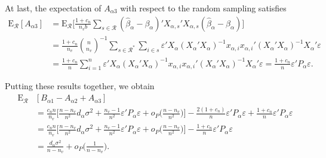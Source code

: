 \documentclass[Research_Module_ES.tex]{subfiles}
\begin{document}
At last, the expectation of $A_{\alpha3}$ with respect to the random sampling satisfies
\begin{align*}
\mathrm{E}_\mathcal{R}[A_{\alpha3}] 
&=\mathrm{E}_\mathcal{R}\biggl[ \frac{1+c_n}{n_vb}\sum_{s\in \mathcal{R}}(\hat{\beta}_\alpha-\beta_\alpha)'X_{\alpha,s}'X_{\alpha,s}(\hat{\beta}_\alpha-\beta_\alpha)\biggr]\\
&= \frac{1+c_n}{n_v}\binom{n}{n_v}^{-1}\sum_{s\in\mathcal{R}^\ast}\sum_{i\in s}\varepsilon'X_{\alpha}(X_{\alpha}'X_{\alpha})^{-1}x_{\alpha,i}x_{\alpha,i}'(X_{\alpha}'X_{\alpha})^{-1}X_{\alpha}'\varepsilon\\
&= \frac{1+c_n}{n}\sum_{i=1}^n\varepsilon'X_{\alpha}(X_{\alpha}'X_{\alpha})^{-1}x_{\alpha,i}x_{\alpha,i}'(X_{\alpha}'X_{\alpha})^{-1}X_{\alpha}'\varepsilon
= \frac{1+c_n}{n}\varepsilon'P_\alpha\varepsilon.
\end{align*}

Putting these results together, we obtain
\begin{align*}
\mathrm{E}_\mathcal{R}&[B_{\alpha1}-A_{\alpha2}+A_{\alpha3}]\\
&= \frac{c_nn}{n_v}\biggl[\frac{n-n_v}{n^2}d_\alpha\sigma^2
+\frac{n_v-1}{n^2}\varepsilon'P_\alpha\varepsilon + o_P\biggl(\frac{n-n_v}{n^2}\biggr)\biggr]
-\frac{2(1+c_n)}{n} \varepsilon'P_\alpha\varepsilon
+\frac{1+c_n}{n}\varepsilon'P_\alpha\varepsilon\\
&= \frac{c_nn}{n_v}\biggl[\frac{n-n_v}{n^2}d_\alpha\sigma^2
+\frac{n_v-1}{n^2}\varepsilon'P_\alpha\varepsilon + o_P\biggl(\frac{n-n_v}{n^2}\biggr)\biggr]
-\frac{1+c_n}{n} \varepsilon'P_\alpha\varepsilon\\
&=\frac{d_\alpha\sigma^2}{n-n_v}+ o_P\biggl(\frac{1}{n-n_v}\biggr).
\end{align*}
\end{document}
